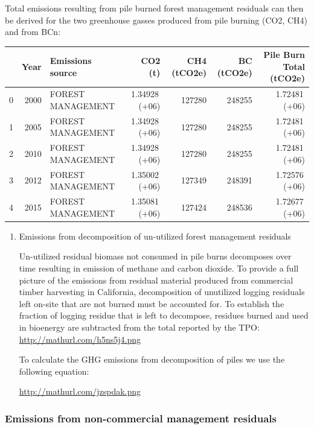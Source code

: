\documentclass[a4paper]{article}
\begin{document}
Total emissions resulting from pile burned forest management residuals
can then be derived for the two greenhouse gasses produced from pile
burning (CO2, CH4) and from BCn:

\begin{center}
\begin{tabular}{rrlrrrr}
 & Year & Emissions source & CO2 (t) & CH4 (tCO2e) & BC (tCO2e) & Pile Burn Total (tCO2e)\\
\hline
0 & 2000 & FOREST MANAGEMENT & 1.34928\,(+06) & 127280 & 248255 & 1.72481\,(+06)\\
1 & 2005 & FOREST MANAGEMENT & 1.34928\,(+06) & 127280 & 248255 & 1.72481\,(+06)\\
2 & 2010 & FOREST MANAGEMENT & 1.34928\,(+06) & 127280 & 248255 & 1.72481\,(+06)\\
3 & 2012 & FOREST MANAGEMENT & 1.35002\,(+06) & 127349 & 248391 & 1.72576\,(+06)\\
4 & 2015 & FOREST MANAGEMENT & 1.35081\,(+06) & 127424 & 248536 & 1.72677\,(+06)\\
\end{tabular}

\end{center}

\begin{enumerate}
\item Emissions from decomposition of un-utilized forest management
\label{sec:orgheadline7}
residuals

Un-utilized residual biomass not consumed in pile burns decomposes over
time resulting in emission of methane and carbon dioxide. To provide a
full picture of the emissions from residual material produced from
commercial timber harvesting in California, decomposition of unutilized
logging residuals left on-site that are not burned must be accounted
for. To establish the fraction of logging residue that is left to
decompose, residues burned and used in bioenergy are subtracted from the
total reported by the TPO: \url{http://mathurl.com/h5ns5j4.png}

To calculate the GHG emissions from decomposition of piles we use the
following equation:

\url{http://mathurl.com/jzspdak.png}
\end{enumerate}
\subsubsection{Emissions from non-commercial management residuals}
\label{sec:orgheadline10}
\end{document}
